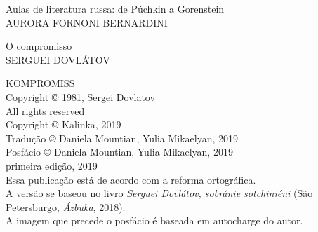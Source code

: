 \noindent{}Aulas de literatura russa: de Púchkin a Gorenstein \\
AURORA FORNONI BERNARDINI
\medskip

\noindent{}O compromisso\\
SERGUEI DOVLÁTOV

\newpage
\pagestyle{empty}
\MyriadPro
\scriptsize
\begin{center}
KOMPROMISS\\[6pt]

Copyright © 1981, Sergei Dovlatov\\[6pt]

All rights reserved\\[20pt]

Copyright © Kalinka, 2019\\[6pt]

Tradução © Daniela Mountian, Yulia Mikaelyan, 2019\\[6pt]

Posfácio © Daniela Mountian, Yulia Mikaelyan, 2019\\[6pt]

primeira edição, 2019\\[40pt]


Essa publicação está de acordo com a reforma ortográfica.\\[6pt]
A versão se baseou no livro \emph{Serguei Dovlátov, sobránie sotchiniéni} (São Petersburgo, \emph{Ázbuka}, 2018).\\[6pt]	
A imagem que precede o posfácio é baseada em autocharge do autor.\\[20pt]
\end{center}


\bigskip

